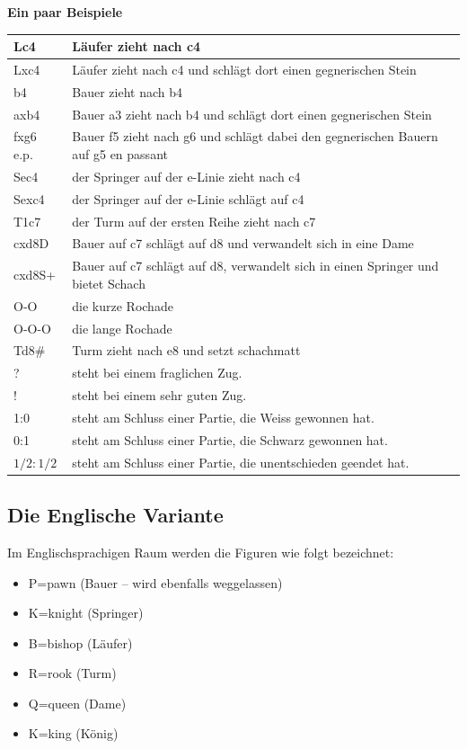 \documentclass{article}
\begin{document}
{\bf Ein paar Beispiele}

\begin{center}
\begin{tabular}{|l|p{}|}
\hline
Lc4 & Läufer zieht nach c4 \\
\hline
Lxc4 & Läufer zieht nach c4 und schlägt dort einen gegnerischen Stein \\
\hline
b4 & Bauer zieht nach b4\\
\hline
axb4	& Bauer a3 zieht nach b4 und schlägt dort einen gegnerischen Stein\\
\hline
fxg6 e.p. & Bauer f5 zieht nach g6 und schlägt dabei den gegnerischen Bauern auf g5 en passant \\
\hline
Sec4 & der Springer auf der e-Linie zieht nach c4\\
\hline
Sexc4 & der Springer auf der e-Linie schlägt auf c4\\
\hline
T1c7 & der Turm auf der ersten Reihe zieht nach c7 \\
\hline
cxd8D & Bauer auf c7 schlägt auf d8 und verwandelt sich in eine Dame\\
\hline
cxd8S+ & Bauer auf c7 schlägt auf d8, verwandelt sich in einen Springer und bietet Schach \\
\hline
O-O & die kurze Rochade\\
\hline
O-O-O & die lange Rochade \\
\hline
Td8\# & Turm zieht nach e8 und setzt schachmatt \\
\hline
? & steht bei einem fraglichen Zug. \\
\hline
! & steht bei einem sehr guten Zug. \\
\hline
1:0 & steht am Schluss einer Partie, die Weiss gewonnen hat. \\
\hline
0:1 & steht am Schluss einer Partie, die Schwarz gewonnen hat. \\
\hline
$1/2:1/2$& steht am Schluss einer Partie, die unentschieden  geendet hat. \\
\hline
\end{tabular}
\end{center}

\subsection{Die Englische Variante}
Im Englischsprachigen Raum werden die Figuren wie folgt bezeichnet:
\begin{itemize}
\item P=pawn (Bauer -- wird ebenfalls weggelassen)
\item K=knight (Springer)
\item B=bishop (Läufer)
\item R=rook (Turm)
\item Q=queen (Dame)
\item K=king (König)
\end{itemize}
\end{document}
